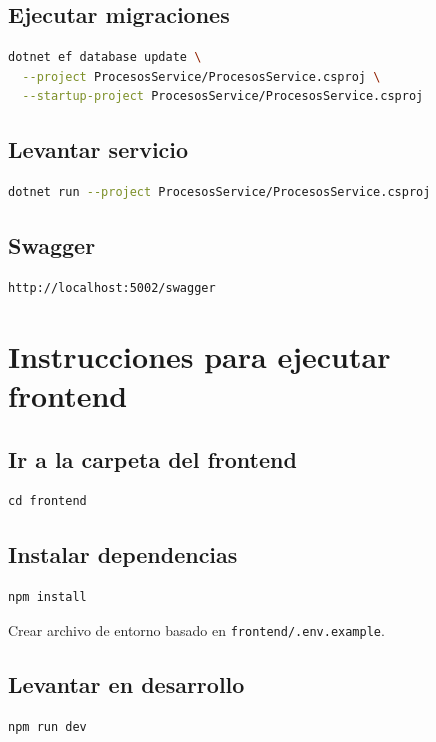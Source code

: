 \documentclass[12pt]{article}
\begin{document}
\subsection*{Ejecutar migraciones}
\begin{lstlisting}[language=bash]
dotnet ef database update \
  --project ProcesosService/ProcesosService.csproj \
  --startup-project ProcesosService/ProcesosService.csproj
\end{lstlisting}

\subsection*{Levantar servicio}
\begin{lstlisting}[language=bash]
dotnet run --project ProcesosService/ProcesosService.csproj
\end{lstlisting}

\subsection*{Swagger}
\begin{lstlisting}[language=bash]
http://localhost:5002/swagger
\end{lstlisting}

\section{Instrucciones para ejecutar frontend}

\subsection*{Ir a la carpeta del frontend}
\begin{verbatim}
cd frontend
\end{verbatim}

\subsection*{Instalar dependencias}
\begin{verbatim}
npm install
\end{verbatim}

Crear archivo de entorno basado en \texttt{frontend/.env.example}.

\subsection*{Levantar en desarrollo}
\begin{verbatim}
npm run dev
\end{verbatim}
\end{document}
